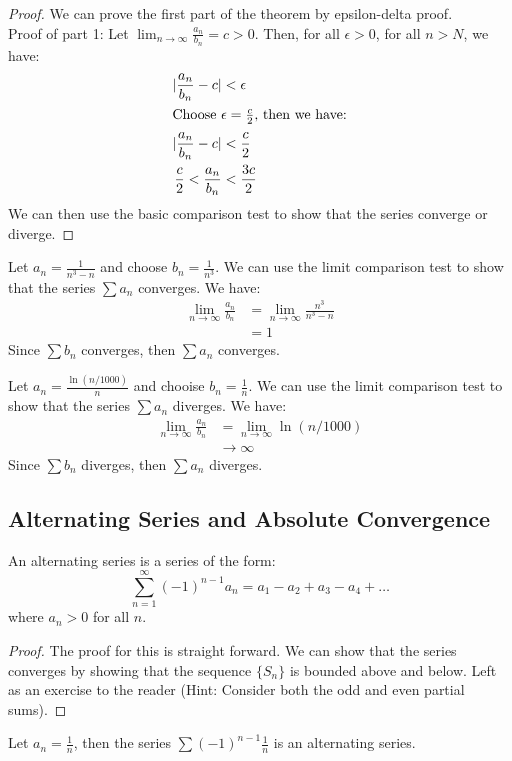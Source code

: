 \documentclass[11pt]{report}
\begin{document}
\begin{proof}
    We can prove the first part of the theorem by epsilon-delta proof. 
    \\
    Proof of part 1: Let $\lim_{n \to \infty} \frac{a_n}{b_n} = c > 0$. Then, for all $\epsilon > 0$, for all $n > N$, we have:
    \begin{align*}
        |\frac{a_n}{b_n} - c| &< \epsilon \\
        \intertext{Choose $\epsilon = \frac{c}{2}$, then we have:}
        |\frac{a_n}{b_n} - c| &< \frac{c}{2} \\
        \frac{c}{2} < \frac{a_n}{b_n} &< \frac{3c}{2} \\
    \end{align*}
    We can then use the basic comparison test to show that the series converge or diverge.
\end{proof}
\begin{example}
    Let $a_n = \frac{1}{n^3 - n}$ and choose $b_n = \frac{1}{n^3}$. We can use the limit comparison test to show that the series $\sum a_n$ converges. We have:
    \begin{align*}
        \lim_{n \to \infty} \frac{a_n}{b_n} &= \lim_{n \to \infty} \frac{n^3}{n^3 - n} \\
        &= 1
    \end{align*}
    Since $\sum b_n$ converges, then $\sum a_n$ converges.
\end{example}
\begin{example}
    Let $a_n = \frac{\ln(n/1000)}{n}$ and chooise $b_n = \frac{1}{n}$. We can use the limit comparison test to show that the series $\sum a_n$ diverges. We have:
    \begin{align*}
        \lim_{n \to \infty} \frac{a_n}{b_n} &= \lim_{n \to \infty} \ln(n/1000) \\
        &\to \infty
    \end{align*}
    Since $\sum b_n$ diverges, then $\sum a_n$ diverges.
\end{example}
\subsection{Alternating Series and Absolute Convergence}
\begin{definition}
    An alternating series is a series of the form:
    \begin{equation}
        \sum_{n=1}^{\infty} (-1)^{n-1} a_n = a_1 - a_2 + a_3 - a_4 + \ldots
    \end{equation}
    where $a_n > 0$ for all $n$.
\end{definition}
\begin{proof}
    The proof for this is straight forward. We can show that the series converges by showing that the sequence $\{S_n\}$ is bounded above and below. Left as an exercise to the reader (Hint: Consider both the odd and even partial sums).
\end{proof}
\begin{example}
    Let $a_n = \frac{1}{n}$, then the series $\sum (-1)^{n-1} \frac{1}{n}$ is an alternating series.
\end{example}
\end{document}
